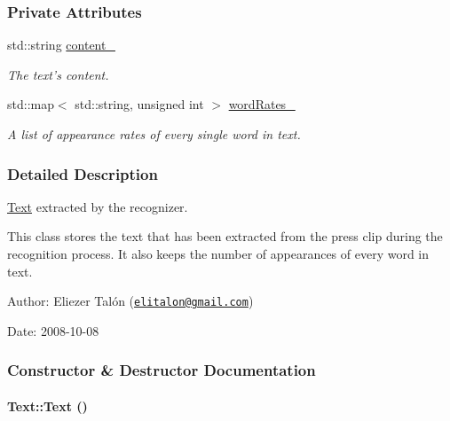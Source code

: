 \subsubsection*{Private Attributes}
\begin{CompactItemize}
\item 
\hypertarget{class_text_8c5acddb86730d41099c87da7e386f6c}{
std::string \hyperlink{class_text_8c5acddb86730d41099c87da7e386f6c}{content\_\-}}
\label{class_text_8c5acddb86730d41099c87da7e386f6c}

\begin{CompactList}\small\item\em The text's content. \item\end{CompactList}\item 
\hypertarget{class_text_5f7e6b9d9ba0dbd7c1b4070ab42f1de1}{
std::map$<$ std::string, unsigned int $>$ \hyperlink{class_text_5f7e6b9d9ba0dbd7c1b4070ab42f1de1}{wordRates\_\-}}
\label{class_text_5f7e6b9d9ba0dbd7c1b4070ab42f1de1}

\begin{CompactList}\small\item\em A list of appearance rates of every single word in text. \item\end{CompactList}\end{CompactItemize}


\subsubsection{Detailed Description}
\hyperlink{class_text}{Text} extracted by the recognizer. 

This class stores the text that has been extracted from the press clip during the recognition process. It also keeps the number of appearances of every word in text.

\begin{Desc}
\item[Author:]Eliezer Talón (\href{mailto:elitalon@gmail.com}{\tt elitalon@gmail.com}) \end{Desc}
\begin{Desc}
\item[Date:]2008-10-08 \end{Desc}


\subsubsection{Constructor \& Destructor Documentation}
\hypertarget{class_text_b3e26143fccc52699bcc5149cae852bc}{
\paragraph[{Text}]{\setlength{\rightskip}{0pt plus 5cm}Text::Text ()}\hfill}
\label{class_text_b3e26143fccc52699bcc5149cae852bc}


